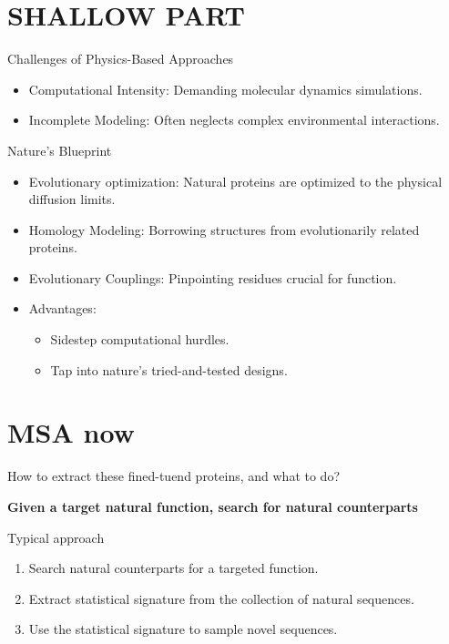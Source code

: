 \documentclass[presentation,smaller]{beamer}
\author{vopuu}
\date{\today}
\title{}
\begin{document}
\section*{SHALLOW PART}
\label{sec:org8373cf6}

\begin{frame}[label={sec:orgd2983e0}]{Challenges of Physics-Based Approaches}
\begin{itemize}
\item \alert{\alert{Computational Intensity}}: Demanding molecular dynamics simulations.
\item \alert{\alert{Incomplete Modeling}}: Often neglects complex environmental interactions.
\end{itemize}
\end{frame}

\begin{frame}[label={sec:org45a2c8d}]{Nature's Blueprint}
\begin{itemize}
\item \alert{\alert{Evolutionary optimization}}: Natural proteins are optimized to the physical
diffusion limits.
\item \alert{\alert{Homology Modeling}}: Borrowing structures from evolutionarily related proteins.
\item \alert{\alert{Evolutionary Couplings}}: Pinpointing residues crucial for function.
\item \alert{\alert{Advantages}}:
\begin{itemize}
\item Sidestep computational hurdles.
\item Tap into nature's tried-and-tested designs.
\end{itemize}
\end{itemize}
\end{frame}

\section*{MSA now}
\label{sec:org8cd3381}

\begin{frame}[label={sec:orgdabadae}]{How to extract these fined-tuend proteins, and what to do?}
\begin{center}
\Large \textbf{Given a target natural function, search for natural counterparts}
\end{center}
\end{frame}

\begin{frame}[label={sec:org91b69ee}]{Typical approach}
\begin{center}
\Large
\begin{enumerate}
\item Search natural counterparts for a targeted function.
\item Extract statistical signature from the collection of natural sequences.
\item Use the statistical signature to sample novel sequences.
\end{enumerate}
\end{center}
\end{frame}
\end{document}
